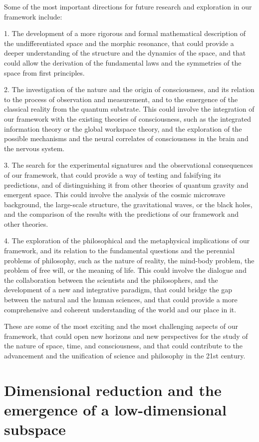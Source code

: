 Some of the most important directions for future research and exploration in our framework include:

1. The development of a more rigorous and formal mathematical description of the undifferentiated space and the morphic resonance, that could provide a deeper understanding of the structure and the dynamics of the space, and that could allow the derivation of the fundamental laws and the symmetries of the space from first principles.

2. The investigation of the nature and the origin of consciousness, and its relation to the process of observation and measurement, and to the emergence of the classical reality from the quantum substrate. This could involve the integration of our framework with the existing theories of consciousness, such as the integrated information theory or the global workspace theory, and the exploration of the possible mechanisms and the neural correlates of consciousness in the brain and the nervous system.

3. The search for the experimental signatures and the observational consequences of our framework, that could provide a way of testing and falsifying its predictions, and of distinguishing it from other theories of quantum gravity and emergent space. This could involve the analysis of the cosmic microwave background, the large-scale structure, the gravitational waves, or the black holes, and the comparison of the results with the predictions of our framework and other theories.

4. The exploration of the philosophical and the metaphysical implications of our framework, and its relation to the fundamental questions and the perennial problems of philosophy, such as the nature of reality, the mind-body problem, the problem of free will, or the meaning of life. This could involve the dialogue and the collaboration between the scientists and the philosophers, and the development of a new and integrative paradigm, that could bridge the gap between the natural and the human sciences, and that could provide a more comprehensive and coherent understanding of the world and our place in it.

These are some of the most exciting and the most challenging aspects of our framework, that could open new horizons and new perspectives for the study of the nature of space, time, and consciousness, and that could contribute to the advancement and the unification of science and philosophy in the 21st century.

\section{Dimensional reduction and the emergence of a low-dimensional subspace}
